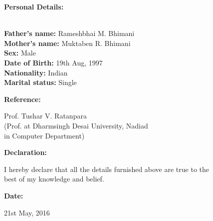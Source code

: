 \documentclass[12pt,a4paper,english]{article}
\begin{document}
	\begin{flushleft}	
		\begin{LARGE}
			\textbf{Personal Details:}
		\end{LARGE}\\
		\vspace{0.12in}
		\hspace{1.75in}\textbf{Father's name:} Rameshbhai M. Bhimani\\
		\hspace{1.75in}\textbf{Mother's name:} Muktaben R. Bhimani\\
		\hspace{1.75in}\textbf{Sex:} Male\\
		\hspace{1.75in}\textbf{Date of Birth:} 19th Aug, 1997\\	
		\hspace{1.75in}\textbf{Nationality:} Indian\\
		\hspace{1.75in}\textbf{Marital status:} Single\\
		\vspace{0.3in}
	\hline
	\vspace{0.3in}
	\begin{large}
		\textbf{Reference:}
	\end{large}
	\hspace{.51in} Prof. Tushar V. Ratanpara\\\hspace{1.75in}(Prof. at Dharmsingh Desai University, Nadiad \\\hspace{1.75in}in Computer Department)\\
	\begin{large}
		\textbf{Declaration:}
	\end{large}\hspace{0.39in}
	I hereby declare that all the details furnished above are true to the\\\hspace{1.74in}best of my knowledge and belief.\\
	\begin{large}
		\textbf{Date:}
	\end{large}\hspace{1.05in}
	21st May, 2016\\
	\vspace{0.3in}
	\hline
	\end{flushleft}
\end{document}
